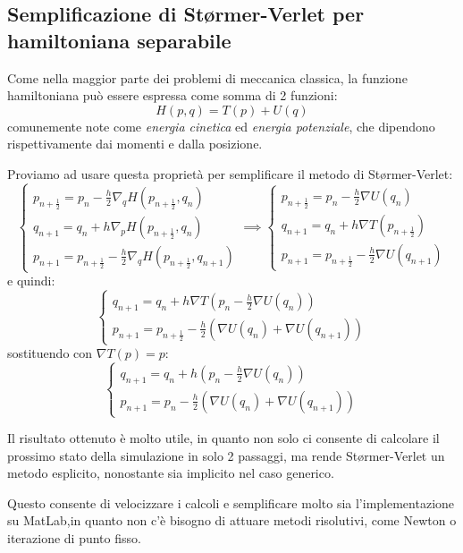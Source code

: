 \documentclass[a4paper]{article}
\numberwithin{equation}{section}
\numberwithin{figure}{section}
\begin{document}
\subsection{Semplificazione di Størmer-Verlet per hamiltoniana separabile}
Come nella maggior parte dei problemi di meccanica classica, la funzione hamiltoniana
può essere espressa come somma di 2 funzioni:
\begin{equation}
	H(p,q) = T(p) + U(q)
\end{equation}
comunemente note come \textit{energia cinetica} ed \textit{energia potenziale}, che
dipendono rispettivamente dai momenti e dalla posizione.

Proviamo ad usare questa proprietà per semplificare il metodo di Størmer-Verlet:
$$
\begin{cases}
	p_{n+\frac{1}{2}} = p_n - \frac{h}{2}\nabla_q H(p_{n+\frac{1}{2}},q_n)\\
	q_{n+1} = q_n + h \nabla_p H(p_{n+\frac{1}{2}}, q_n)\\
	p_{n+1} = p_{n+\frac{1}{2}} - \frac{h}{2} \nabla_q H(p_{n+\frac{1}{2}},q_{n+1})
\end{cases}
\implies
\begin{cases}
	p_{n+\frac{1}{2}} = p_n - \frac{h}{2}\nabla U(q_n)\\
	q_{n+1} = q_n + h \nabla T(p_{n+\frac{1}{2}})\\
	p_{n+1} = p_{n+\frac{1}{2}} - \frac{h}{2} \nabla U(q_{n+1})
\end{cases}
$$
e quindi:
$$
\begin{cases}
	q_{n+1} = q_n + h \nabla T(p_n - \frac{h}{2}\nabla U(q_n))\\
	p_{n+1} = p_{n+\frac{1}{2}} - \frac{h}{2} (\nabla U(q_n)+\nabla U(q_{n+1}))
\end{cases}
$$
sostituendo con $\nabla T(p)=p$:
$$
\begin{cases}
	q_{n+1} = q_n + h(p_n-\frac{h}{2}\nabla U(q_n))\\
	p_{n+1} = p_n - \frac{h}{2} (\nabla U(q_n)+\nabla U(q_{n+1}))
\end{cases}
$$

Il risultato ottenuto è molto utile, in quanto non solo ci consente di calcolare il prossimo
stato della simulazione in solo 2 passaggi, ma rende Størmer-Verlet un metodo esplicito, nonostante
sia implicito nel caso generico.

Questo consente di velocizzare i calcoli e semplificare molto sia l'implementazione su MatLab,in
quanto non c'è bisogno di attuare metodi risolutivi, come Newton o iterazione di punto fisso.
\end{document}

